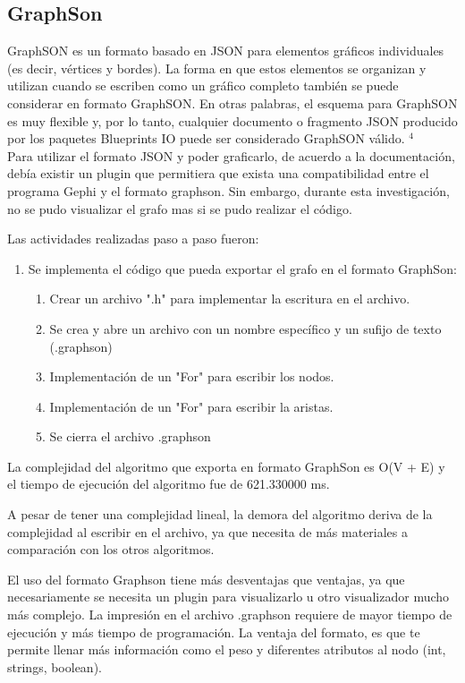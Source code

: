 \documentclass[book, 16 pt, conference]{ieeeconf}
\begin{document}
\subsection{GraphSon}

GraphSON es un formato basado en JSON para elementos gráficos individuales (es decir, vértices y bordes). La forma en que estos elementos se organizan y utilizan cuando se escriben como un gráfico completo también se puede considerar en formato GraphSON. En otras palabras, el esquema para GraphSON es muy flexible y, por lo tanto, cualquier documento o fragmento JSON producido por los paquetes Blueprints IO puede ser considerado GraphSON válido. $^{4}$ \\

Para utilizar el formato JSON y poder graficarlo, de acuerdo a la documentación, debía existir un plugin que permitiera que exista una compatibilidad entre el programa Gephi y el formato graphson. Sin embargo, durante esta investigación, no se pudo visualizar el grafo mas si se pudo realizar el código.

Las actividades realizadas paso a paso fueron: \\

\begin{enumerate}
\item Se implementa el código que pueda exportar el grafo en el formato GraphSon:
	\begin{enumerate}
	\item Crear un archivo ".h" para implementar la escritura en el archivo. 
	\item Se crea y abre un archivo con un nombre específico y un sufijo de texto (.graphson)
	\item Implementación de un "For" para escribir los nodos.
	\item Implementación de un "For" para escribir la aristas.
	\item Se cierra el archivo .graphson
	\end{enumerate}
\end{enumerate} 

La complejidad del algoritmo que exporta en formato GraphSon es O(V + E) y el tiempo de ejecución del algoritmo fue de 621.330000 ms.

A pesar de tener una complejidad lineal, la demora del algoritmo deriva de la complejidad al escribir en el archivo, ya que necesita de más materiales a comparación con los otros algoritmos. 

El uso del formato Graphson tiene más desventajas que ventajas, ya que necesariamente se necesita un plugin para visualizarlo u otro visualizador mucho más complejo. La impresión en el archivo .graphson requiere de mayor tiempo de ejecución y más tiempo de programación. La ventaja del formato, es que te permite llenar más información como el peso y diferentes atributos al nodo (int, strings, boolean).
\end{document}
